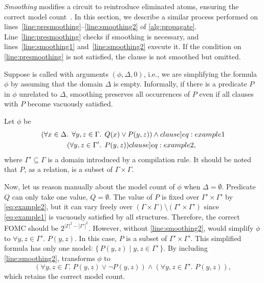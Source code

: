 \documentclass[a4paper,UKenglish,cleveref, autoref, thm-restate]{lipics-v2021}
\begin{document}
\emph{Smoothing} modifies a circuit to reintroduce eliminated atoms, ensuring
the correct model
count~\cite{darwiche2001tractable,DBLP:conf/ijcai/BroeckTMDR11}. In this
section, we describe a similar process performed on
lines~\ref{line:presmoothing}--\ref{line:smoothing2} of \cref{alg:propagate}.
Line~\ref{line:presmoothing} checks if smoothing is necessary, and
lines~\ref{line:smoothing1} and~\ref{line:smoothing2} execute it. If the
condition on \autoref{line:presmoothing} is not satisfied, the clause is not
smoothed but omitted.

Suppose \Propagate is called with arguments $(\phi, \Delta, 0)$, i.e., we are
simplifying the formula $\phi$ by assuming that the domain $\Delta$ is empty.
Informally, if there is a predicate $P$ in $\phi$ unrelated to $\Delta$,
smoothing preserves all occurrences of $P$ even if all clauses with $P$ become
vacuously satisfied.

\begin{example}\label{example:basecasesmoothing}
  Let $\phi$ be
  \begin{align}
    (\forall x \in \Delta\text{. }\forall y, z \in \Gamma&\text{. }Q(x) \lor P(y, z))\land{}\label[clause]{eq:example1}\\
    (\forall y, z \in \Gamma'&\text{. }P(y, z))\label[clause]{eq:example2},
  \end{align}
  where $\Gamma' \subseteq \Gamma$ is a domain introduced by a compilation rule.
  It should be noted that $P$, as a relation, is a subset of
  $\Gamma \times \Gamma$.

  Now, let us reason manually about the model count of $\phi$ when
  $\Delta = \emptyset$. Predicate $Q$ can only take one value, $Q = \emptyset$.
  The value of $P$ is fixed over $\Gamma' \times \Gamma'$ by \cref{eq:example2},
  but it can vary freely over
  $(\Gamma \times \Gamma) \setminus (\Gamma' \times \Gamma')$ since
  \cref{eq:example1} is vacuously satisfied by all structures. Therefore, the
  correct FOMC should be $2^{|\Gamma|^2 - |\Gamma'|^2}$. However, without
  \autoref{line:smoothing2}, \Propagate would simplify $\phi$ to
  $\forall y, z \in \Gamma'\text{. }P(y, z)$. In this case, $P$ is a subset of
  $\Gamma' \times \Gamma'$. This simplified formula has only one model:
  $\{\, P(y, z) \mid y, z \in \Gamma' \,\}$. By including
  \autoref{line:smoothing2}, \Propagate transforms $\phi$ to
  \[
    (\forall y, z \in \Gamma\text{. }P(y, z) \lor \neg P(y, z)) \land (\forall y, z \in \Gamma'\text{. }P(y, z)),
  \]
  which retains the correct model count.
\end{example}
\end{document}
